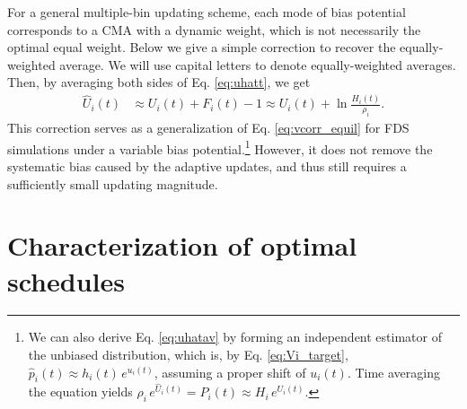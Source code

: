 \documentclass[reprint, superscriptaddress, floatfix]{revtex4-1}
\begin{document}
For a general multiple-bin updating scheme,
each mode of bias potential
corresponds to a CMA with a dynamic weight,
which is not necessarily the optimal equal weight.
%
Below we give a simple correction
to recover the equally-weighted average.
%
We will use capital letters to denote equally-weighted averages.
%
Then, by averaging both sides of Eq. \eqref{eq:uhatt}, we get
\begin{align}
  \hat U_i(t)
  &\approx
  U_i (t)
  + F_i(t) - 1
  \approx
  U_i(t)
  + \ln \frac{ H_i(t) } { \rho_i }
  .
  \label{eq:uhatav}
\end{align}
%
This correction serves as
a generalization of Eq. \eqref{eq:vcorr_equil}
for FDS simulations under
a variable bias potential.\footnote{We can also
  derive Eq. \eqref{eq:uhatav}
  by forming an independent estimator
  of the unbiased distribution\cite{marsili2006},
  which is, by Eq. \eqref{eq:Vi_target},
  $\hat p_i(t) \approx h_i(t) \, e^{ u_i(t) }$,
  assuming a proper shift of $u_i(t)$.
  Time averaging the equation yields
  $\rho_i \, e^{\hat U_i(t)} = \hat P_i(t) \approx H_i \, e^{ U_i(t) }$.}
%
However, it does not remove the systematic bias
caused by the adaptive updates,
and thus still requires a sufficiently small updating magnitude.







\section{\label{sec:schedule_geometry}
Characterization of optimal schedules}
\end{document}
